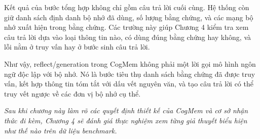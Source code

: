 \documentclass[../main.tex]{subfiles}
\begin{document}
Kết quả của bước tổng hợp không chỉ gồm câu trả lời cuối cùng. Hệ thống còn giữ danh sách định danh bộ nhớ đã dùng, số lượng bằng chứng, và các mạng bộ nhớ xuất hiện trong bằng chứng. Các trường này giúp Chương 4 kiểm tra xem câu trả lời dựa vào loại thông tin nào, có dùng đúng bằng chứng hay không, và lỗi nằm ở truy vấn hay ở bước sinh câu trả lời.

Như vậy, reflect/generation trong CogMem không phải một lời gọi mô hình ngôn ngữ độc lập với bộ nhớ. Nó là bước tiêu thụ danh sách bằng chứng đã được truy vấn, kết hợp thông tin tóm tắt với dấu vết nguyên văn, và tạo câu trả lời có thể truy vết ngược về các đơn vị bộ nhớ cụ thể.

\vspace{1em}
\noindent\textit{Sau khi chương này làm rõ các quyết định thiết kế của CogMem và cơ sở nhận thức đi kèm, Chương 4 sẽ đánh giá thực nghiệm xem từng giả thuyết biểu hiện như thế nào trên dữ liệu benchmark.}
\end{document}
